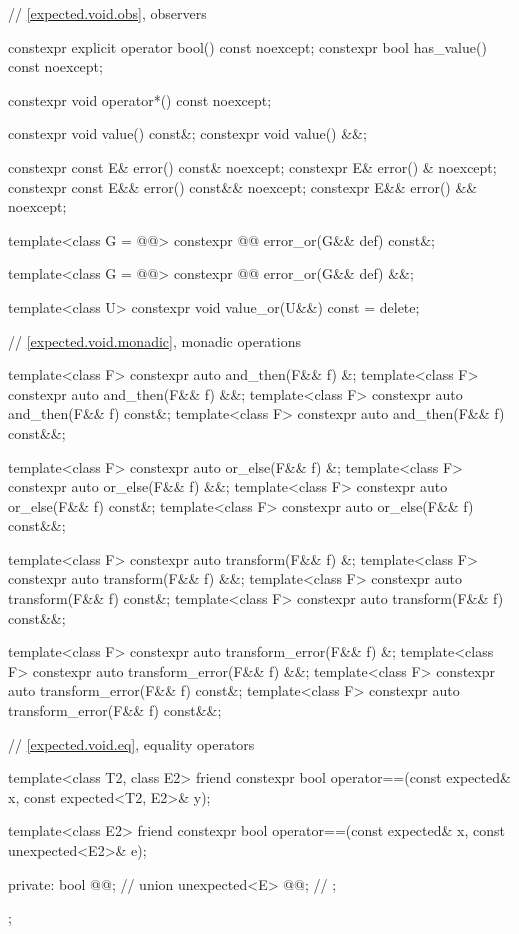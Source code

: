 \begin{codeblock}
{{    // \ref{expected.void.obs}, observers

    constexpr explicit operator bool() const noexcept;
    constexpr bool has_value() const noexcept;

    constexpr void operator*() const noexcept;

    constexpr void value() const&;
    constexpr void value() &&;

    constexpr const E& error() const& noexcept;
    constexpr E& error() & noexcept;
    constexpr const E&& error() const&& noexcept;
    constexpr E&& error() && noexcept;

    template<class G = @@>
    constexpr @@ error_or(G&& def) const&;

    template<class G = @@>
    constexpr @@ error_or(G&& def) &&;

    template<class U> constexpr void value_or(U&&) const = delete;

    // \ref{expected.void.monadic}, monadic operations

    template<class F> constexpr auto and_then(F&& f) &;
    template<class F> constexpr auto and_then(F&& f) &&;
    template<class F> constexpr auto and_then(F&& f) const&;
    template<class F> constexpr auto and_then(F&& f) const&&;

    template<class F> constexpr auto or_else(F&& f) &;
    template<class F> constexpr auto or_else(F&& f) &&;
    template<class F> constexpr auto or_else(F&& f) const&;
    template<class F> constexpr auto or_else(F&& f) const&&;

    template<class F> constexpr auto transform(F&& f) &;
    template<class F> constexpr auto transform(F&& f) &&;
    template<class F> constexpr auto transform(F&& f) const&;
    template<class F> constexpr auto transform(F&& f) const&&;

    template<class F> constexpr auto transform_error(F&& f) &;
    template<class F> constexpr auto transform_error(F&& f) &&;
    template<class F> constexpr auto transform_error(F&& f) const&;
    template<class F> constexpr auto transform_error(F&& f) const&&;

    // \ref{expected.void.eq}, equality operators

    template<class T2, class E2>
    friend constexpr bool operator==(const expected& x, const expected<T2, E2>& y);

    template<class E2>
    friend constexpr bool operator==(const expected& x, const unexpected<E2>& e);

  private:
    bool @@; // \expos
    union {
      unexpected<E> @@; // \expos
    };
  };
}
\end{codeblock}

